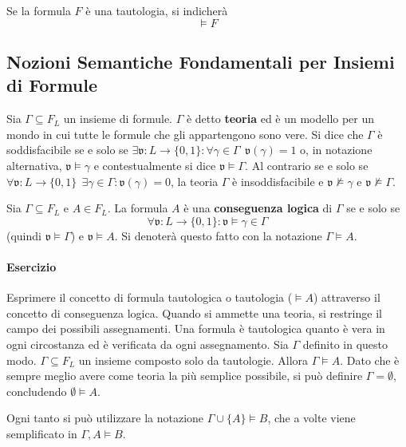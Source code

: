 \begin{defi}[Tautologia]
Se la formula $F$ è una tautologia, si indicherà 
$$
\models F
$$
\end{defi}


\subsection{Nozioni Semantiche Fondamentali per Insiemi di Formule}
Sia $\Gamma \subseteq F_L$ un insieme di formule. $\Gamma$ è detto 
\textbf{teoria} ed è un modello per un mondo in cui tutte le formule che 
gli appartengono sono vere. Si dice che $\Gamma$ è soddisfacibile 
se e solo se  $\exists \mathfrak{v}: L \rightarrow \{0,1\} : \forall \gamma \in \Gamma ~~ \mathfrak{v}(\gamma) = 1$
o, in notazione alternativa, $\mathfrak{v} \models \gamma$ e contestualmente 
si dice $\mathfrak{v} \models \Gamma$. Al contrario se e solo se 
$\forall \mathfrak{v}: L \rightarrow \{0,1\} ~~ \exists \gamma \in \Gamma : \mathfrak{v}(\gamma) = 0$, 
la teoria $\Gamma$ è insoddisfacibile e $\mathfrak{v} \nvDash \gamma$ e 
$\mathfrak{v} \nvDash \Gamma$. 

\begin{defi}
Sia $\Gamma \subseteq F_L$ e $A \in F_L$. La formula $A$ è una 
\textbf{conseguenza logica} di $\Gamma$ se e solo se 
$$
\forall \mathfrak{v}: L \rightarrow \{0,1\} : \mathfrak{v} \models\gamma \in \Gamma
$$ 
(quindi $\mathfrak{v} \models\Gamma$) e $\mathfrak{v} \models A$. 
Si denoterà questo fatto con la notazione $\Gamma \models A$.
\end{defi}

\paragraph{Esercizio} 
Esprimere il concetto di formula tautologica o tautologia ($\models A$)
attraverso il concetto di conseguenza logica. 
Quando si ammette una teoria, si restringe il campo dei possibili assegnamenti. 
Una formula è tautologica quanto è vera in ogni circostanza ed è verificata 
da ogni assegnamento. Sia $\Gamma$ definito in questo modo. $\Gamma \subseteq F_L$ 
un insieme composto solo da tautologie. Allora 
$\Gamma \models A$. Dato che è sempre meglio avere come teoria la più semplice 
possibile, si può definire $\Gamma = \emptyset$, concludendo $\emptyset \models A$. 

\noindent
Ogni tanto si può utilizzare la notazione $\Gamma \cup \{A\} \models B$, che 
a volte viene semplificato in $\Gamma,A \models B$. 

